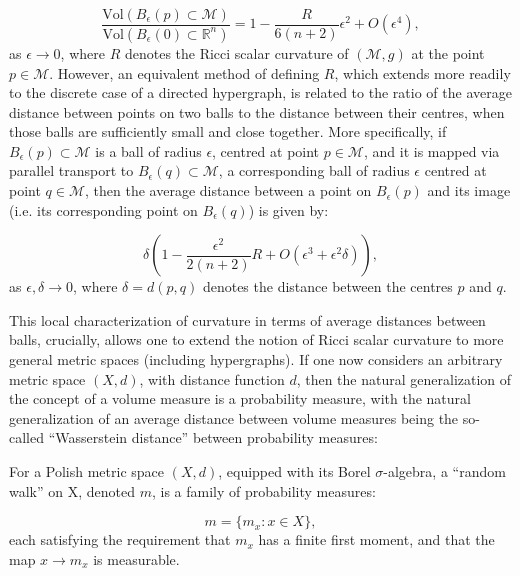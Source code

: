 \documentclass{article}
\begin{document}
\begin{equation}
\frac{\mathrm{Vol} \left( B_{\epsilon} \left( p \right) \subset \mathcal{M} \right)}{\mathrm{Vol} \left( B_{\epsilon} \left( 0 \right) \subset \mathbb{R}^n \right)} = 1 - \frac{R}{6 \left( n + 2 \right)} \epsilon^2 + O \left( \epsilon^4 \right),
\end{equation}
as ${\epsilon \to 0}$, where $R$ denotes the Ricci scalar curvature of ${\left( \mathcal{M}, g \right)}$ at the point ${p \in \mathcal{M}}$. However, an equivalent method of defining $R$, which extends more readily to the discrete case of a directed hypergraph, is related to the ratio of the average distance between points on two balls to the distance between their centres, when those balls are sufficiently small and close together. More specifically, if ${B_{\epsilon} \left( p \right) \subset \mathcal{M}}$ is a ball of radius ${\epsilon}$, centred at point ${p \in \mathcal{M}}$, and it is mapped via parallel transport to ${B_{\epsilon} \left( q \right) \subset \mathcal{M}}$, a corresponding ball of radius ${\epsilon}$ centred at point ${q \in \mathcal{M}}$, then the average distance between a point on ${B_{\epsilon} \left( p \right)}$ and its image (i.e. its corresponding point on ${B_{\epsilon} \left( q \right)}$) is given by:

\begin{equation}
\delta \left( 1 - \frac{\epsilon^2}{2 \left( n + 2 \right)} R + O \left( \epsilon^3 + \epsilon^2 \delta \right) \right),
\end{equation}
as ${\epsilon, \delta \to 0}$, where ${\delta = d \left( p, q \right)}$ denotes the distance between the centres $p$ and $q$.

This local characterization of curvature in terms of average distances between balls, crucially, allows one to extend the notion of Ricci scalar curvature to more general metric spaces (including hypergraphs)\cite{ollivier}\cite{ollivier2}\cite{ollivier3}. If one now considers an arbitrary metric space ${\left( X, d \right)}$, with distance function $d$, then the natural generalization of the concept of a volume measure is a probability measure, with the natural generalization of an average distance between volume measures being the so-called ``Wasserstein distance'' between probability measures:

\begin{definition}
For a Polish metric space ${\left( X, d \right)}$, equipped with its Borel ${\sigma}$-algebra, a ``random walk'' on X, denoted $m$, is a family of probability measures:

\begin{equation}
m = \lbrace m_x : x \in X \rbrace,
\end{equation}
each satisfying the requirement that ${m_x}$ has a finite first moment, and that the map ${x \to m_x}$ is measurable.
\end{definition}
\end{document}
